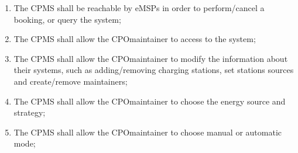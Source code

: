 \begin{enumerate}[label=\textbf{R\arabic*}]
    \item The \ac{CPMS} shall be reachable by \acp{eMSP} in order to perform/cancel a booking, or query the system;
    \item The \ac{CPMS} shall allow the \ac{CPO}maintainer to access to the system;
    \item The \ac{CPMS} shall allow the \ac{CPO}maintainer to modify the information about their systems, such as adding/removing charging stations, set stations sources and create/remove maintainers;
    \item The \ac{CPMS} shall allow the \ac{CPO}maintainer to choose the energy source and strategy;
    \item The \ac{CPMS} shall allow the \ac{CPO}maintainer to choose manual or automatic mode;
\end{enumerate}


\clearpage
